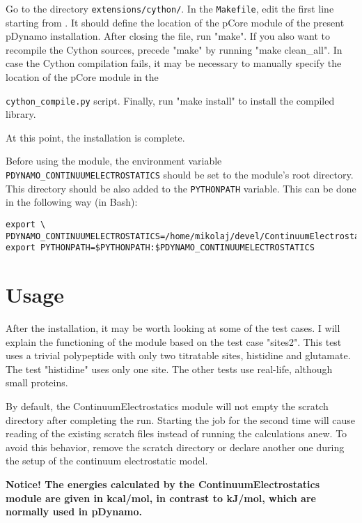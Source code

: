 \documentclass[a4paper,11pt]{article}
\newcommand{\modulename}{ContinuumElectrostatics\xspace}
\begin{document}
\bigskip
Go to the directory \texttt{extensions/cython/}.
%
In the \texttt{Makefile}, edit the first line starting from .
%
It should define the location of the pCore module of the present pDynamo installation.
%
After closing the file, run "make".
%
If you also want to recompile the Cython sources, precede "make" by running "make clean\_all". 
%
In case the Cython compilation fails, it may be necessary to manually specify the location of the pCore module in the {\texttt{cython\_compile.py} script.
%
Finally, run "make install" to install the compiled library.

\bigskip
At this point, the installation is complete.

\bigskip
Before using the module, the environment variable \texttt{PDYNAMO\_CONTINUUMELECTROSTATICS} 
should be set to the module's root directory.
%
This directory should be also added to the \texttt{PYTHONPATH} variable. 
%
This can be done in the following way (in Bash):

\newpage
{\footnotesize \begin{lstlisting}
export \ PDYNAMO_CONTINUUMELECTROSTATICS=/home/mikolaj/devel/ContinuumElectrostatics
export PYTHONPATH=$PYTHONPATH:$PDYNAMO_CONTINUUMELECTROSTATICS
\end{lstlisting} }


\section{Usage}
After the installation, it may be worth looking at some of the test cases.
%
I will explain the functioning of the module based on the test case "sites2".
%
This test uses a trivial polypeptide with only two titratable sites,
histidine and glutamate.
%
The test "histidine" uses only one site. The other tests use real-life,
although small proteins.


By default, the \modulename module will not empty the scratch directory
after completing the run.
%
Starting the job for the second time will cause reading of the existing 
scratch files instead of running the calculations anew.
%
To avoid this behavior, remove the scratch directory or declare another one
during the setup of the continuum electrostatic model.

\textbf{Notice! The energies calculated by the \modulename module are 
given in kcal/mol, in contrast to kJ/mol, which are normally used 
in pDynamo.}


}
\end{document}
